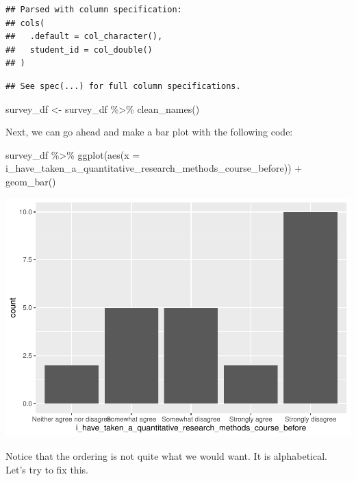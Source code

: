 \documentclass[
]{book}
\newenvironment{Shaded}{\begin{snugshade}}{\end{snugshade}}
\newcommand{\AttributeTok}[1]{\textcolor[rgb]{0.77,0.63,0.00}{#1}}
\newcommand{\FunctionTok}[1]{\textcolor[rgb]{0.00,0.00,0.00}{#1}}
\newcommand{\NormalTok}[1]{#1}
\newcommand{\OtherTok}[1]{\textcolor[rgb]{0.56,0.35,0.01}{#1}}
\newcommand{\SpecialCharTok}[1]{\textcolor[rgb]{0.00,0.00,0.00}{#1}}
\begin{document}
\begin{verbatim}
## Parsed with column specification:
## cols(
##   .default = col_character(),
##   student_id = col_double()
## )
\end{verbatim}

\begin{verbatim}
## See spec(...) for full column specifications.
\end{verbatim}

\begin{Shaded}
\begin{Highlighting}[]
\NormalTok{survey\_df }\OtherTok{\textless{}{-}}\NormalTok{ survey\_df }\SpecialCharTok{\%\textgreater{}\%} \FunctionTok{clean\_names}\NormalTok{()}
\end{Highlighting}
\end{Shaded}

Next, we can go ahead and make a bar plot with the following code:

\begin{Shaded}
\begin{Highlighting}[]
\NormalTok{survey\_df }\SpecialCharTok{\%\textgreater{}\%} 
  \FunctionTok{ggplot}\NormalTok{(}\FunctionTok{aes}\NormalTok{(}\AttributeTok{x =}\NormalTok{ i\_have\_taken\_a\_quantitative\_research\_methods\_course\_before)) }\SpecialCharTok{+}
  \FunctionTok{geom\_bar}\NormalTok{()}
\end{Highlighting}
\end{Shaded}

\includegraphics{test_course_notes_files/figure-latex/geom-bar-1.pdf}

Notice that the ordering is not quite what we would want. It is alphabetical. Let's try to fix this.
\end{document}
